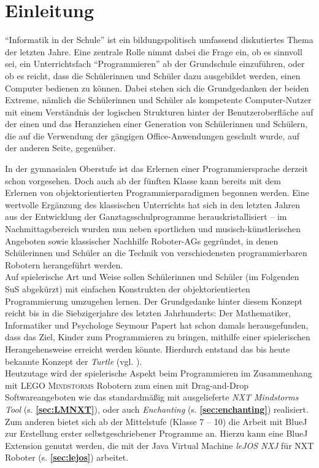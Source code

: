 \documentclass[paper=a4, DIV=14, BCOR=15mm, twoside=on, onecolumn=on, open = right, titlepage =on, parskip =half, headsepline = on, footsepline = on, chapterprefix = on, appendixprefix = off, fontsize = 12pt, numbers = noenddot, abstract = on]{scrbook}
\begin{document}
\newpage
\thispagestyle{plain}





\thispagestyle{empty}
\cleardoublepage
\newpage
\listoffigures
\newpage
\tableofcontents
\thispagestyle{empty}
\cleardoublepage
\newpage
\par \singlespacing
\chapter{Einleitung}
\onehalfspacing
"`Informatik in der Schule"' ist ein bildungspolitisch umfassend diskutiertes Thema der letzten Jahre. Eine zentrale Rolle nimmt dabei die Frage ein, ob es sinnvoll sei, ein Unterrichtsfach "`Programmieren"' ab der Grundschule einzuführen, oder ob es reicht, dass die Schülerinnen und Schüler dazu ausgebildet werden, einen Computer bedienen zu können. Dabei stehen sich die Grundgedanken der beiden Extreme, nämlich die Schülerinnen und Schüler als kompetente Computer-Nutzer mit einem Verständnis der logischen Strukturen hinter der Benutzeroberfläche auf der einen und das Heranziehen einer Generation von Schülerinnen und Schülern, die auf die Verwendung der gängigen Office-Anwendungen geschult wurde, auf der anderen Seite, gegenüber.

In der gymnasialen Oberstufe ist das Erlernen einer Programmiersprache derzeit schon vorgesehen. Doch auch ab der fünften Klasse kann bereits mit dem Erlernen von objektorientierten Programmierparadigmen begonnen werden. Eine wertvolle Ergänzung des klassischen Unterrichts hat sich in den letzten Jahren aus der Entwicklung der Ganztagsschulprogramme herauskristallisiert -- im Nachmittagsbereich wurden nun neben sportlichen und musisch-künstlerischen Angeboten sowie klassischer Nachhilfe Roboter-AGs gegründet, in denen Schülerinnen und Schüler an die Technik von verschiedensten programmierbaren Robotern herangeführt werden.\\
Auf spielerische Art und Weise sollen Schülerinnen und Schüler (im Folgenden SuS abgekürzt) mit einfachen Konstrukten der objektorientierten Programmierung umzugehen lernen. Der Grundgedanke hinter diesem Konzept reicht bis in die Siebzigerjahre des letzten Jahrhunderts: Der Mathematiker, Informatiker und Psychologe Seymour Papert hat schon damals herausgefunden, dass das Ziel, Kinder zum Programmieren zu bringen, mithilfe einer spielerischen Herangehensweise erreicht werden könnte. Hierdurch entstand das bis heute bekannte Konzept der \emph{Turtle} (vgl. \cite[S.365]{nievergelt:99}).\\
Heutzutage wird der spielerische Aspekt beim Programmieren im Zusammenhang mit \textsc{LEGO Mindstorms} Robotern zum einen mit Drag-and-Drop Softwareangeboten wie das standardmäßig mit ausgelieferte \emph{NXT Mindstorms Tool} (s.  \textbf{\ref{sec:LMNXT}}), oder auch \emph{Enchanting} (s. \textbf{\ref{sec:enchanting}}) realisiert. Zum anderen bietet sich ab der Mittelstufe (Klasse 7 -- 10) die Arbeit mit BlueJ zur Erstellung erster selbstgeschriebener Programme an. Hierzu kann eine BlueJ Extension genutzt werden, die mit der Java Virtual Machine \emph{leJOS NXJ} für NXT Roboter (s. \textbf{\ref{sec:lejos}}) arbeitet.
\end{document}
